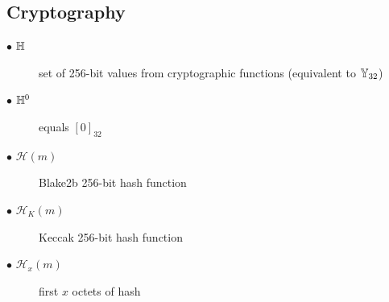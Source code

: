 \subsection{Cryptography}\label{sec:cryptography}
\begin{description}
  \item[$\bullet$ $\mathbb{H}$] set of 256-bit values from cryptographic functions (equivalent to $\mathbb{Y}_{32}$)
  \item[$\bullet$ $\mathbb{H}^0$] equals $[0]_{32}$
  \item[$\bullet$ $\mathcal{H}(m)$] Blake2b 256-bit hash function
  \item[$\bullet$ $\mathcal{H}_K(m)$] Keccak 256-bit hash function
  \item[$\bullet$ $\mathcal{H}_x(m)$] first $x$ octets of hash
\end{description}

